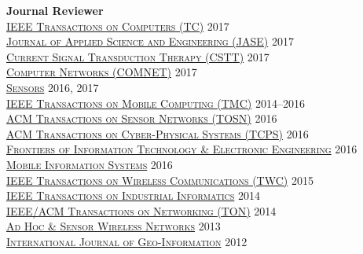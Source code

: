 {\bf Journal Reviewer}\\
{\href{https://www.computer.org/web/tc}{\textsc{IEEE Transactions on Computers (TC)}}} \hfill 2017\\
{\href{http://jase.tku.edu.tw/}{\textsc{Journal of Applied Science and Engineering (JASE)}}} \hfill 2017\\
{\href{http://benthamscience.com/journals/current-signal-transduction-therapy/}{\textsc{Current Signal Transduction Therapy (CSTT)}}} \hfill 2017\\
{\href{http://ees.elsevier.com/comnet/}{\textsc{Computer Networks (COMNET)}}} \hfill 2017\\
{\href{http://www.mdpi.com/journal/sensors}{\textsc{Sensors}}} \hfill 2016, 2017\\
{\href{http://www.computer.org/portal/web/tmc}{\textsc{IEEE Transactions on Mobile Computing (TMC)}}} \hfill 2014--2016\\
{\href{http://tosn.acm.org/}{\textsc{ACM Transactions on Sensor Networks (TOSN)}}} \hfill 2016\\
{\href{http://tcps.acm.org/}{\textsc{ACM Transactions on Cyber-Physical Systems (TCPS)}}} \hfill 2016\\
{\href{http://www.springer.com/computer/journal/11714}{\textsc{Frontiers of Information Technology \& Electronic Engineering}}} \hfill 2016\\
{\href{https://www.hindawi.com/journals/misy/}{\textsc{Mobile Information Systems}}} \hfill 2016\\
{\href{http://www.comsoc.org/twc}{\textsc{IEEE Transactions on Wireless Communications (TWC)}}} \hfill 2015\\
{\href{http://tii.ieee-ies.org}{\textsc{IEEE Transactions on Industrial Informatics}}} \hfill 2014\\
{\href{http://www.ifp.illinois.edu/ton}{\textsc{IEEE/ACM Transactions on Networking (TON)}}} \hfill 2014\\
{\href{http://www.oldcitypublishing.com/AHSWN/AHSWN.html}{\textsc{Ad Hoc \& Sensor Wireless Networks}}} \hfill 2013\\
{\href{http://www.mdpi.com/journal/ijgi}{\textsc{International Journal of Geo-Information}}} \hfill 2012\\
